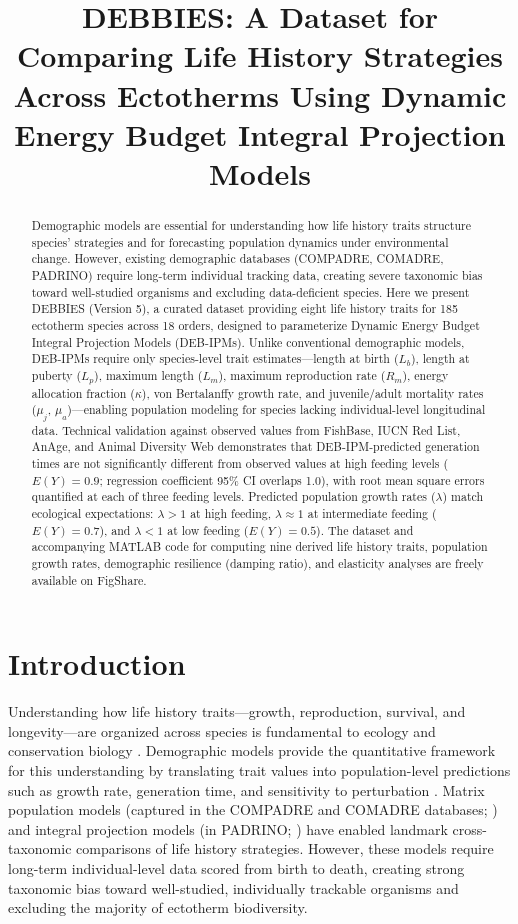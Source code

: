 \documentclass[11pt]{article}
\title{DEBBIES: A Dataset for Comparing Life History Strategies Across Ectotherms Using Dynamic Energy Budget Integral Projection Models}
\author{}
\date{}
\begin{document}
\maketitle

\begin{abstract}
Demographic models are essential for understanding how life history traits structure species' strategies and for forecasting population dynamics under environmental change. However, existing demographic databases (COMPADRE, COMADRE, PADRINO) require long-term individual tracking data, creating severe taxonomic bias toward well-studied organisms and excluding data-deficient species. Here we present DEBBIES (Version 5), a curated dataset providing eight life history traits for 185 ectotherm species across 18 orders, designed to parameterize Dynamic Energy Budget Integral Projection Models (DEB-IPMs). Unlike conventional demographic models, DEB-IPMs require only species-level trait estimates---length at birth ($L_b$), length at puberty ($L_p$), maximum length ($L_m$), maximum reproduction rate ($R_m$), energy allocation fraction ($\kappa$), von Bertalanffy growth rate, and juvenile/adult mortality rates ($\mu_j$, $\mu_a$)---enabling population modeling for species lacking individual-level longitudinal data. Technical validation against observed values from FishBase, IUCN Red List, AnAge, and Animal Diversity Web demonstrates that DEB-IPM-predicted generation times are not significantly different from observed values at high feeding levels ($E(Y) = 0.9$; regression coefficient 95\% CI overlaps 1.0), with root mean square errors quantified at each of three feeding levels. Predicted population growth rates ($\lambda$) match ecological expectations: $\lambda > 1$ at high feeding, $\lambda \approx 1$ at intermediate feeding ($E(Y) = 0.7$), and $\lambda < 1$ at low feeding ($E(Y) = 0.5$). The dataset and accompanying MATLAB code for computing nine derived life history traits, population growth rates, demographic resilience (damping ratio), and elasticity analyses are freely available on FigShare.
\end{abstract}

\section{Introduction}

Understanding how life history traits---growth, reproduction, survival, and longevity---are organized across species is fundamental to ecology and conservation biology \citep{stearns1992evolution}. Demographic models provide the quantitative framework for this understanding by translating trait values into population-level predictions such as growth rate, generation time, and sensitivity to perturbation \citep{caswell2001matrix}. Matrix population models (captured in the COMPADRE and COMADRE databases; \citealt{salguero2016compadre, salguero2016comadre}) and integral projection models (in PADRINO; \citealt{levin2016padrino}) have enabled landmark cross-taxonomic comparisons of life history strategies. However, these models require long-term individual-level data scored from birth to death, creating strong taxonomic bias toward well-studied, individually trackable organisms and excluding the majority of ectotherm biodiversity.
\end{document}
